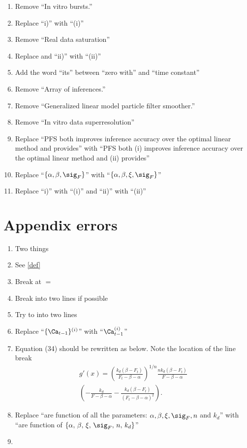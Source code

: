 \begin{enumerate}
\item Remove ``In vitro bursts.''
\item Replace ``i)'' with ``(i)'' 
\item Remove ``Real data saturation''
\item Replace and ``ii)'' with ``(ii)''
\item Add the word ``its'' between ``zero with'' and ``time constant''
\item Remove ``Array of inferences.''
\item Remove ``Generalized linear model particle filter smoother.''
\item Remove ``In vitro data superresolution''
\item Replace ``PFS both improves inference accuracy over the optimal linear method and provides'' with ``PFS both (i) improves inference accuracy over the optimal linear method and (ii) provides''
\item Replace ``$\{\alpha,\beta,\sig_F\}$'' with ``$\{\alpha, \beta, \xi, \sig_F\}$''
\item Replace ``i)'' with ``(i)'' and ``ii)'' with ``(ii)''
\end{enumerate}

\section{Appendix errors}

\begin{enumerate}

\item Two things
\ita 
\item See \ref{def}
\item Break at $=$
\itb
\item Break into two lines if possible
\item Try to into two lines
\item Replace ``$\{\Ca_{t-1}\}^{(i)}$'' with ``$\Ca_{t-1}^{(i)}$''
\item Equation (34) should be rewritten as below.  Note the location of the line break
\begin{multline}
g'(x) = \left(\frac{k_d (\beta -F_t)}{F_t - \beta - \alpha}\right)^{1/n}  \frac{n k_d (\beta - F_t)}{F-\beta-\alpha} \\ 
\left(-\frac{k_d}{F-\beta-\alpha}-\frac{k_d(\beta-F_t)}{(F_t-\beta-\alpha)^2}\right).
\end{multline}
\item Replace ``are function of all the parameters: $\alpha, \beta, \xi, \sig_F, n$ and $k_d$'' with ``are function of $\{\alpha, \, \beta, \, \xi, \, \sig_F, \, n, \, k_d\}$''
\item 
\end{enumerate}


